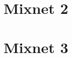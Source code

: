 \documentclass[preprint,12pt,3p]{elsarticle}
\begin{document}
\section{Mixnet 2}
\section{Mixnet 3}
\label{appendix-sec1}


% 
% 
% 
% 
% 
% 
% 
% 
% 
% 
% 
% 

\end{document}
